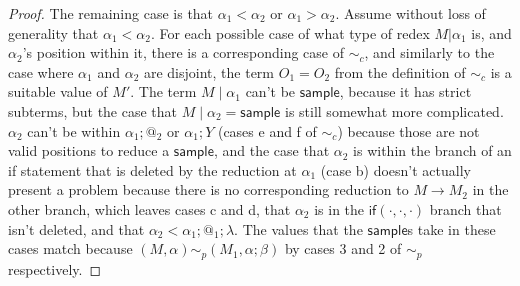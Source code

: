 \documentclass{article}
\newcommand{\tif}[3]{\mathsf{if}(#1, #2, #3)} %
\newcommand{\tsample}{\mathsf{sample}}
\theoremstyle{definition}
\theoremstyle{lemma}
\theoremstyle{remark}
\begin{document}
\begin{proof}
The remaining case is that $\alpha_1 < \alpha_2$ or $\alpha_1 > \alpha_2$. 
Assume without loss of generality that $\alpha_1 < \alpha_2$. 
For each possible case of what type of redex $M | \alpha_1$ is, and $\alpha_2$'s position within it, there is a corresponding case of $\sim_c$, and similarly to the case where $\alpha_1$ and $\alpha_2$ are disjoint, the term $O_1 = O_2$ from the definition of $\sim_c$ is a suitable value of $M'$. 
The term $M \mid \alpha_1$ can't be $\tsample$, because it has strict subterms, but the case that $M \mid \alpha_2 = \tsample$ is still somewhat more complicated. 
$\alpha_2$ can't be within $\alpha_1 ; @_2$ or $\alpha_1 ; Y$ (cases e and f of $\sim_c$) because those are not valid positions to reduce a $\tsample$, 
and the case that $\alpha_2$ is within the branch of an if statement that is deleted by the reduction at $\alpha_1$ (case b) doesn't actually present a problem because there is no corresponding reduction to $M \to M_2$ in the other branch, 
which leaves cases c and d, that $\alpha_2$ is in the $\tif{\cdot}{\cdot}{\cdot}$ branch that isn't deleted, and that $\alpha_2 < \alpha_1 ; @_1 ; \lambda$.  
The values that the $\tsample$s take in these cases match because $(M,\alpha) \sim_p (M_1, \alpha;\beta)$ by cases 3 and 2 of $\sim_p$ respectively.


\end{proof}
\end{document}
